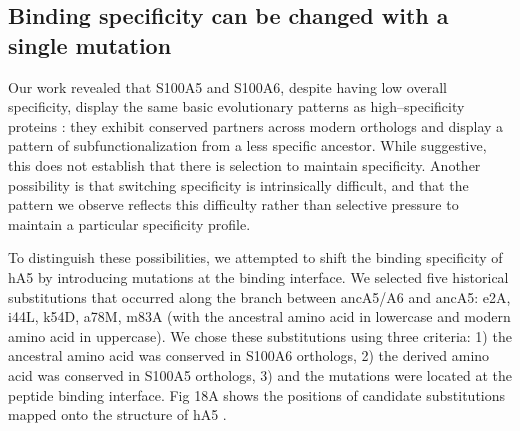 \subsection{Binding specificity can be changed with a single mutation}

Our work revealed that S100A5 and S100A6, despite having low overall
specificity, display the same basic evolutionary patterns as high--specificity
proteins \citep{eick_evolution_2012,clifton_ancestral_2016,alhindi_protein_2017}:
they exhibit conserved partners across modern orthologs and display
a pattern of subfunctionalization from a less specific ancestor. While
suggestive, this does not establish that there is selection to maintain
specificity. Another possibility is that switching specificity is
intrinsically difficult, and that the pattern we observe reflects
this difficulty rather than selective pressure to maintain a particular
specificity profile. 

To distinguish these possibilities, we attempted to shift the binding
specificity of hA5 by introducing mutations at the binding interface.
We selected five historical substitutions that occurred along the
branch between ancA5/A6 and ancA5: e2A, i44L, k54D, a78M, m83A (with
the ancestral amino acid in lowercase and modern amino acid in uppercase).
We chose these substitutions using three criteria: 1) the ancestral
amino acid was conserved in S100A6 orthologs, 2) the derived amino
acid was conserved in S100A5 orthologs, 3) and the mutations were
located at the peptide binding interface. Fig 18A shows the positions
of candidate substitutions mapped onto the structure of hA5 \citep{bertini_solution_2009}.

